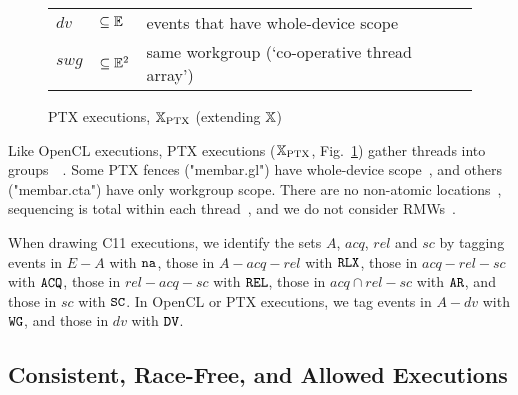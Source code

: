 \begin{figure}[t]
\begin{tabular}{@{}l@{~}l@{~~~~~~~~}l}
$dv$ & $\subseteq \mathbb{E}$ & events that have whole-device scope \\
$swg$ & $\subseteq \mathbb{E}^2$ & same workgroup (`co-operative thread array') \\
\end{tabular}
\par\vspace*{-2mm}
\caption{PTX executions, $\mathbb{X}_{\rm PTX}$ (extending $\mathbb{X}$)}
\label{fig:ptx_exec}
\end{figure}

\begin{definition} 
%
Like OpenCL executions, PTX executions ($\mathbb{X}_{\rm PTX}$,
Fig.~\ref{fig:ptx_exec}) gather threads into
groups~~. Some PTX
fences ("membar.gl") have whole-device scope~,
and others ("membar.cta") have only workgroup scope. There are no
non-atomic locations~, sequencing is total
within each thread~, and we do not consider
RMWs~.
%
\end{definition}

\begin{remark} When drawing C11 executions, we identify the sets $A$,
$acq$, $rel$ and $sc$ by tagging events in $E-A$ with ${\tt na}$, those in
$A - acq - rel$ with ${\tt RLX}$, those in $acq - rel - sc$ with
${\tt ACQ}$, those in $rel - acq - sc$ with ${\tt REL}$, those in
$acq \cap rel - sc$ with ${\tt AR}$, and those in $sc$ with ${\tt SC}$. In
OpenCL or PTX executions, we tag events in $A - dv$ with ${\tt WG}$, and
those in $dv$ with ${\tt DV}$. \end{remark}

\subsection{Consistent, Race-Free, and Allowed Executions}
\label{sec:c11_consistency}

